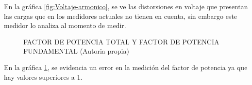       En la gráfica \ref{fig:Voltaje-armonico}, se ve las distorsiones en voltaje que presentan las cargas que en los medidores actuales no tienen en cuenta, sin embargo este medidor lo analiza al momento de medir.
    \begin{figure}[H]
      \hfill
      \hfill
      \hfill
      \caption{FACTOR DE POTENCIA TOTAL Y FACTOR DE POTENCIA FUNDAMENTAL (Autoria propia)}
      \label{fig:factor-potencia}
      \end{figure}
      En la gráfica \ref{fig:factor-potencia}, se evidencia un error en la medición del factor de potencia ya que hay valores superiores a 1.
    
